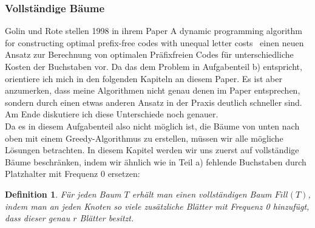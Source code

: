 \documentclass[a4paper,10pt,ngerman]{scrartcl}
\newtheorem{definition}[satz]{Definition}
\begin{document}
    \subsubsection{Vollständige Bäume}
    Golin und Rote stellen 1998 in ihrem Paper \glqq A dynamic programming algorithm for constructing optimal prefix-free codes with unequal letter costs\grqq\autocite{golin_dynamic_1998}~ einen neuen Ansatz zur Berechnung von optimalen Präfixfreien Codes für unterschiedliche Kosten der Buchstaben vor.
    Da das dem Problem in Aufgabenteil b) entspricht, orientiere ich mich in den folgenden Kapiteln an diesem Paper.
    Es ist aber anzumerken, dass meine Algorithmen nicht genau denen im Paper entsprechen, sondern durch einen etwas anderen Ansatz in der Praxis deutlich schneller sind.
    Am Ende diskutiere ich diese Unterschiede noch genauer.\\
    Da es in diesem Aufgabenteil also nicht möglich ist, die Bäume von unten nach oben mit einem Greedy-Algorithmus zu erstellen, müssen wir alle mögliche Lösungen betrachten.
    In diesem Kapitel werden wir uns zuerst auf vollständige Bäume beschränken, indem wir ähnlich wie in Teil a) fehlende Buchstaben durch Platzhalter mit Frequenz 0 ersetzen:
    \begin{definition}
        Für jeden Baum $T$ erhält man einen vollständigen Baum $Fill(T)$, indem man an jeden Knoten so viele zusätzliche Blätter mit Frequenz 0 hinzufügt, dass dieser genau $r$ Blätter besitzt.
    \end{definition}
\end{document}

